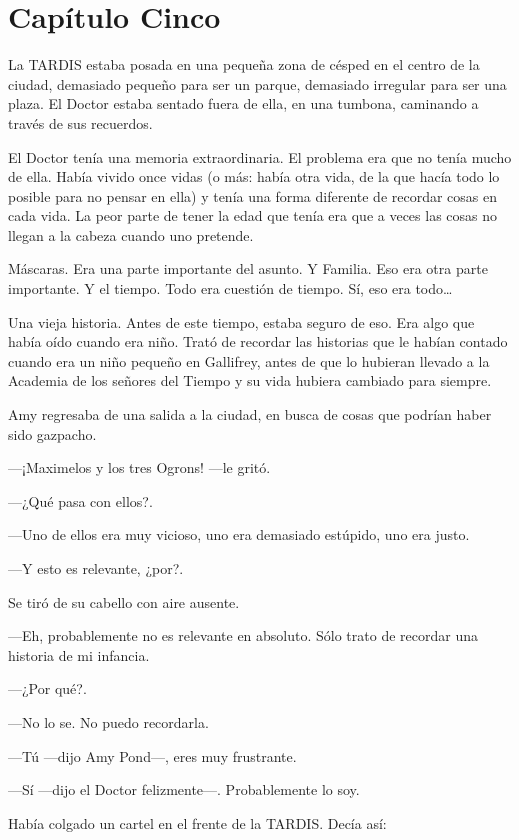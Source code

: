 \chapter*{Capítulo Cinco} 

La TARDIS estaba posada en una pequeña zona de césped en el centro de la ciudad, demasiado pequeño para ser un parque, demasiado irregular para ser una plaza. El Doctor estaba sentado fuera de ella, en una tumbona, caminando a través de sus recuerdos.

El Doctor tenía una memoria extraordinaria. El problema era que no tenía mucho de ella. Había vivido once vidas (o más: había otra vida, de la que hacía todo lo posible para no pensar en ella) y tenía una forma diferente de recordar cosas en cada vida. La peor parte de tener la edad que tenía era que a veces las cosas no llegan a la cabeza cuando uno pretende.

Máscaras. Era una parte importante del asunto. Y Familia. Eso era otra parte importante. Y el tiempo. Todo era cuestión de tiempo. Sí, eso era todo\ldots{}

Una vieja historia. Antes de este tiempo, estaba seguro de eso. Era algo que había oído cuando era niño. Trató de recordar las historias que le habían contado cuando era un niño pequeño en Gallifrey, antes de que lo hubieran llevado a la Academia de los señores del Tiempo y su vida hubiera cambiado para siempre.

Amy regresaba de una salida a la ciudad, en busca de cosas que podrían haber sido gazpacho.

---¡Maximelos y los tres Ogrons! ---le gritó.

---¿Qué pasa con ellos?.

---Uno de ellos era muy vicioso, uno era demasiado estúpido, uno era justo.

---Y esto es relevante, ¿por?.

Se tiró de su cabello con aire ausente.

---Eh, probablemente no es relevante en absoluto. Sólo trato de recordar una historia de mi infancia.

---¿Por qué?.

---No lo se. No puedo recordarla.

---Tú ---dijo Amy Pond---, eres muy frustrante.

---Sí ---dijo el Doctor felizmente---. Probablemente lo soy.

Había colgado un cartel en el frente de la TARDIS. Decía así:

